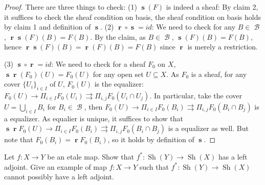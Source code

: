 \documentclass[a4paper]{article}
\DeclareMathOperator{\s}{\mathbf s}
\DeclareMathOperator{\rr}{\mathbf r}
\DeclareMathOperator{\Sh}{\text {Sh}}
\DeclareMathOperator{\B}{\mathcal B}
\begin{document}
\begin{proof}
There are three things to check:\newline
(1) $\s(F)$ is indeed a sheaf:\newline
By claim 2, it suffices to check the sheaf condition on basis, the sheaf condition on basis holds by claim 1 and definition of $\s$. \newline
(2) $\rr\circ \s = id$: \newline
We need to check for any $B\in \B$, $\rr\s(F)(B) = F(B)$. By the claim, as $B\in \B$, $\s(F)(B)= F(B)$, hence $\rr\s(F)(B)=\rr(F)(B)=F(B)$ since $\rr$ is merely a restriction.

(3) $\s\circ\rr = id$:\newline
We need to check for a sheaf $F_0$ on $X$, $\s\rr(F_0)(U)=F_0(U)$ for any open set $U\subseteq X$. As $F_0$ is a sheaf, for any cover $\{U_i\}_{i\in I}$ of $U$, $F_0(U)$ is the equalizer:$ F_0(U)\to\Pi_{i\in I}F_0(U_i)\rightrightarrows\Pi_{i,j}F_0(U_i\cap U_j)$. In particular, take the cover $U=\bigcup_{i\in I}B_i$ for $B_i\in \B$, then  $F_0(U)\to\Pi_{i\in I}F_0(B_i)\rightrightarrows\Pi_{i,j}F_0(B_i\cap B_j)$ is a equalizer. As equalier is unique, it suffices to show that $\s\rr F_0(U)\to\Pi_{i\in I}F_0(B_i)\rightrightarrows\Pi_{i,j}F_0(B_i\cap B_j)$ is a equalizer as well. But note that $F_0(B_i)=\rr F_0(B_i)$, so it holds by definition of $\s$.




\end{proof}
\begin{question}
    Let $f:X\to Y$ be an etale map. Show that $f^*:\Sh(Y)\to \Sh(X)$ has a left adjoint. Give an example of map $f:X\to Y$ such that $f^*:\Sh(Y)\to\Sh(X)$ cannot possibly have a left adjoint.
\end{question}
\end{document}
